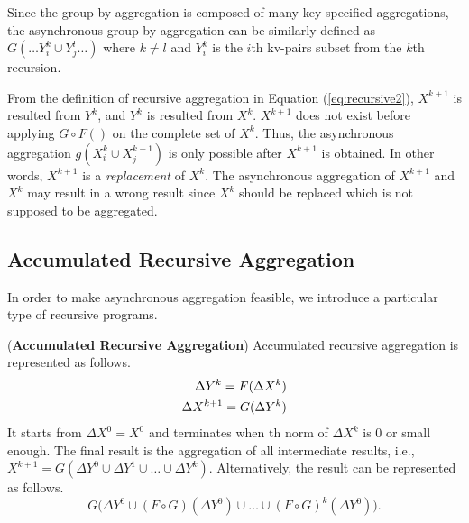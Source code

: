 Since the group-by aggregation is composed of many key-specified aggregations, the asynchronous group-by aggregation can be similarly defined as $G(\ldots Y_{i}^k\cup Y_{j}^{l}\ldots)$ where $k\neq l$ and $Y_i^k$ is the $i$th kv-pairs subset from the $k$th recursion.


From the definition of recursive aggregation in Equation (\ref{eq:recursive2}), $X^{k+1}$ is resulted from $Y^k$, and $Y^k$ is resulted from $X^k$. $X^{k+1}$ does not exist before applying $G\circ F()$ on the complete set of $X^k$. Thus, the asynchronous aggregation $g(X_i^k\cup X_j^{k+1})$ is only possible after $X^{k+1}$ is obtained. In other words, $X^{k+1}$ is a \emph{replacement} of $X^k$. The asynchronous aggregation of $X^{k+1}$ and $X^k$ may result in a wrong result since $X^k$ should be replaced which is not supposed to be aggregated.

\subsection{Accumulated Recursive Aggregation}
\label{sec:async:accrec}

In order to make asynchronous aggregation feasible, we introduce a particular type of recursive programs.

\begin{definition}
	\label{def:accumasync}
	(\textbf{Accumulated Recursive Aggregation}) Accumulated recursive aggregation is represented as follows.
	\begin{equation}\label{eq:accumasync}
	\begin{aligned}
	\Delta Y^{k}= F(\Delta X^k)\notag\\
	\Delta X^{k+1}= G(\Delta Y^{k})\notag
	\end{aligned}
	\end{equation}
	It starts from $\Delta X^0=X^0$ and terminates when th norm of $\Delta X^k$ is 0 or small enough. The final result is the aggregation of all intermediate results, i.e., $X^{k+1}=G(\Delta Y^{0} \cup \Delta Y^{1} \cup \ldots \cup \Delta Y^{k})$. Alternatively, the result can be represented as follows.
	\begin{equation}
	\label{eq:accumasyncres}
	G\Big(\Delta Y^0\cup (F\circ G)(\Delta Y^0)\cup\ldots\cup (F\circ G)^k(\Delta Y^0)\Big).
	\end{equation}
\end{definition}

